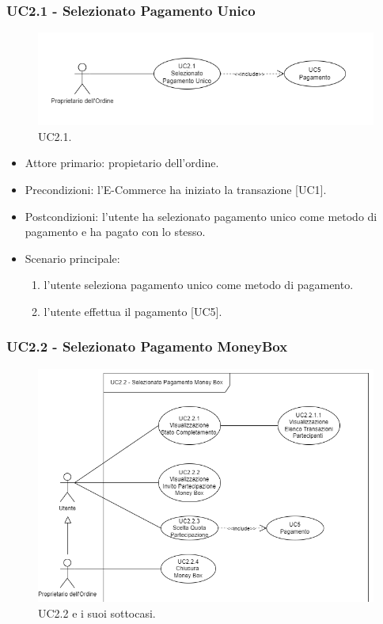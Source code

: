     \subsubsection{UC2.1 - Selezionato Pagamento Unico}

    \begin{figure}[H]
    \centering
    \includegraphics[scale=0.7]{immagini/UseCases-UC2-2.png}
    \caption{UC2.1.}
    \end{figure}

    \begin{itemize}
    \item Attore primario: propietario dell'ordine.
    \item Precondizioni: l'E-Commerce ha iniziato la transazione [UC1].
    \item Postcondizioni: l'utente ha selezionato pagamento unico come metodo di pagamento e ha pagato con lo stesso.
    \item Scenario principale: \begin{enumerate}
        \item l'utente seleziona pagamento unico come metodo di pagamento.
        \item l'utente effettua il pagamento [UC5].
    \end{enumerate}
    \end{itemize}

    \subsubsection{UC2.2 -  Selezionato Pagamento MoneyBox}

    \begin{figure}[H]
    \centering
    \includegraphics[scale=0.7]{immagini/UseCases-UC2-3.png}
    \caption{UC2.2 e i suoi sottocasi.}
    \end{figure}

